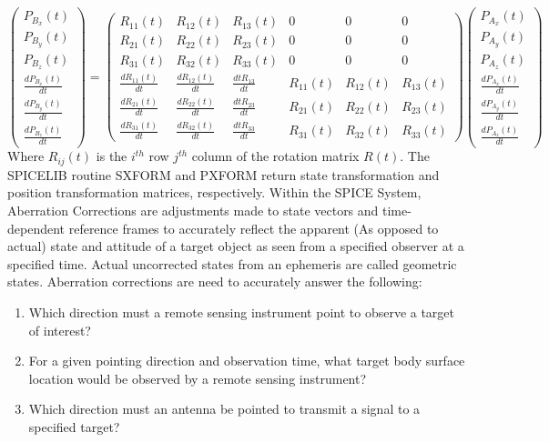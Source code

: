\documentclass[crop=false,class=book]{standalone}
\begin{document}
            \begin{equation}
            \begin{pmatrix}P_{B_{x}}(t)\\P_{B_{y}}(t)\\P_{B_{z}}(t)\\ \frac{dP_{B_{x}}(t)}{dt}\\ \frac{dP_{B_{y}}(t)}{dt}\\ \frac{dP_{B_{z}}(t)}{dt}\end{pmatrix}=
            \begin{pmatrix}R_{11}(t)&R_{12}(t)&R_{13}(t)&0&0&0\\R_{21}(t)&R_{22}(t)&R_{23}(t)&0&0&0\\R_{31}(t)&R_{32}(t)&R_{33}(t)&0&0&0\\\frac{dR_{11}(t)}{dt}&\frac{dR_{12}(t)}{dt}&\frac{dtR_{13}}{dt}&R_{11}(t)&R_{12}(t)&R_{13}(t)\\\frac{dR_{21}(t)}{dt}&\frac{dR_{22}(t)}{dt}&\frac{dtR_{23}}{dt}&R_{21}(t)&R_{22}(t)&R_{23}(t)\\
            \frac{dR_{31}(t)}{dt}&\frac{dR_{32}(t)}{dt}&\frac{dtR_{33}}{dt}&R_{31}(t)&R_{32}(t)&R_{33}(t)\end{pmatrix}
            \begin{pmatrix}P_{A_{x}}(t)\\P_{A_{y}}(t)\\P_{A_{z}}(t)\\ \frac{dP_{A_{x}}(t)}{dt}\\ \frac{dP_{A_{y}}(t)}{dt}\\ \frac{dP_{A_{z}}(t)}{dt}\end{pmatrix} 
            \end{equation}
            Where $R_{ij}(t)$ is the $i^{th}$ row $j^{th}$ column of the rotation matrix $R(t)$. The SPICELIB routine SXFORM and PXFORM return state transformation and position transformation matrices, respectively. Within the SPICE System, Aberration Corrections are adjustments made to state vectors and time-dependent reference frames to accurately reflect the apparent (As opposed to actual) state and attitude of a target object as seen from a specified observer at a specified time. Actual uncorrected states from an ephemeris are called geometric states. Aberration corrections are need to accurately answer the following:
            \begin{enumerate}
                \item Which direction must a remote sensing instrument point to observe a target of interest?
                \item For a given pointing direction and observation time, what target body surface location would be observed by a remote sensing instrument?
                \item Which direction must an antenna be pointed to transmit a signal to a specified target?
            \end{enumerate}
\end{document}
